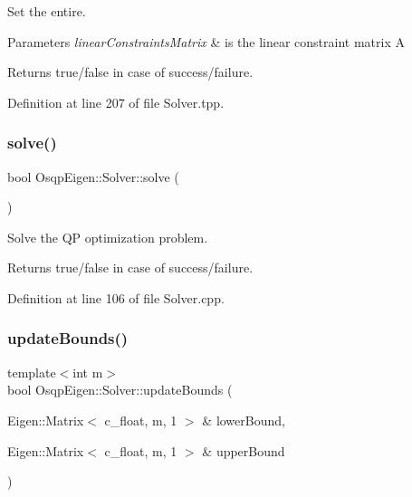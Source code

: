 Set the entire. 


\begin{DoxyParams}{Parameters}
{\em linear\+Constraints\+Matrix} & is the linear constraint matrix A \\
\hline
\end{DoxyParams}
\begin{DoxyReturn}{Returns}
true/false in case of success/failure. 
\end{DoxyReturn}


Definition at line 207 of file Solver.\+tpp.

\mbox{\label{classOsqpEigen_1_1Solver_aade83b0e68b85d47d41a054f04d413aa}} 
\subsubsection{\texorpdfstring{solve()}{solve()}}
{\footnotesize\ttfamily bool Osqp\+Eigen\+::\+Solver\+::solve (\begin{DoxyParamCaption}{ }\end{DoxyParamCaption})}



Solve the QP optimization problem. 

\begin{DoxyReturn}{Returns}
true/false in case of success/failure. 
\end{DoxyReturn}


Definition at line 106 of file Solver.\+cpp.

\mbox{\label{classOsqpEigen_1_1Solver_a1af39f37500a6bad6896e8e6699880fa}} 
\subsubsection{\texorpdfstring{update\+Bounds()}{updateBounds()}\hspace{0.1cm}{\footnotesize\ttfamily [1/2]}}
{\footnotesize\ttfamily template$<$int m$>$ \\
bool Osqp\+Eigen\+::\+Solver\+::update\+Bounds (\begin{DoxyParamCaption}\item[{Eigen\+::\+Matrix$<$ c\+\_\+float, m, 1 $>$ \&}]{lower\+Bound,  }\item[{Eigen\+::\+Matrix$<$ c\+\_\+float, m, 1 $>$ \&}]{upper\+Bound }\end{DoxyParamCaption})}



